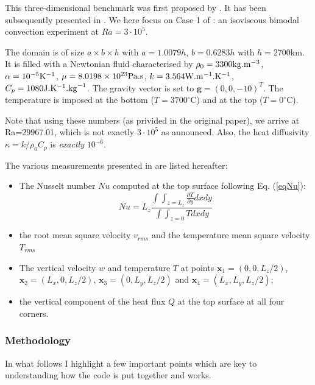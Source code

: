 
This three-dimensional benchmark was first proposed by \cite{bucc93}. 
It has been subsequently presented in \cite{tack94,trha98,albe00,onmm06,dawk11,krhb12}.
We here focus on Case 1 of \cite{bucc93}:  an isoviscous bimodal convection experiment at $Ra=3\cdot 10^5$.

The domain is of size $a\times b\times h$ with $a=1.0079h$, $b=0.6283h$ with $h=2700$km. It is filled with a Newtonian fluid characterised by $\rho_0=3300{\rm kg}.{\rm m}^{-3}$, $\alpha=10^{-5}{\rm K}^{-1}$, 
$\mu=8.0198\times10^{23}{\rm Pa.s}$, 
$k=3.564{\rm W}.{\rm m}^{-1}.{\rm K}^{-1}$, 
$C_p=1080{\rm J}.{\rm K}^{-1}.{\rm kg}^{-1}$.
The gravity vector is set to ${\bm g}=(0,0,-10)^T$.
The temperature is imposed at the bottom  ($T=3700^\circ$C) and at the top ($T=0^\circ$C).

Note that using these numbers (as privided in the original paper), we arrive at Ra=29967.01, which 
is not exactly $3\cdot10^5$ as announced. Also, the heat diffusivity $\kappa=k/\rho_0 C_p$ is 
{\it exactly} $10^{-6}$.

The various measurements presented in \cite{bucc93} are listed hereafter:
\begin{itemize}
\item The Nusselt number $Nu$ computed at the top surface following Eq. (\ref{eqNu}):
\[
Nu = L_z \frac{\int\int_{z=L_z} \frac{\partial T}{\partial y} dx dy  }{\int \int_{z=0} T dx dy}
\]
\item the root mean square velocity $v_{rms}$ and the temperature mean square velocity $T_{rms}$
\item The vertical velocity $w$ and temperature $T$ at points ${\bm x}_1=(0,0,L_z/2)$, ${\bm x}_2=(L_x,0,L_z/2)$,
${\bm x}_3=(0,L_y,L_z/2)$ and ${\bm x}_4=(L_x,L_y,L_z/2)$;
\item the vertical component of the heat flux $Q$ at the top surface  at all four corners. 
\end{itemize}

\subsubsection*{Methodology}

In what follows I highlight a few important points which are key to understanding how the code
is put together and works. 

